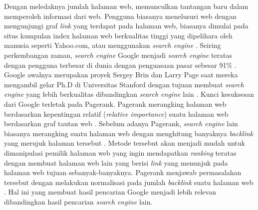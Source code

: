 Dengan meledaknya jumlah halaman web, memunculkan tantangan baru dalam memperoleh informasi dari web. Pengguna biasanya menelusuri web dengan mengunjungi graf \textit{link} yang terdapat pada halaman web, biasanya dimulai pada situs kumpulan index halaman web berkualitas tinggi yang dipelihara oleh manusia seperti Yahoo.com, atau menggunakan \textit{search engine} \citep{brin1998anatomy}. Seiring perkembangan zaman, \textit{search engine} Google menjadi \textit{search engine} teratas dengan pengguna terbesar di dunia dengan penguasaan pasar sebesar 91\% \citep{gsc2022marketshare}. Google awalnya merupakan proyek Sergey Brin dan Larry Page saat mereka mengambil gelar Ph.D di Universitas Stanford dengan tujuan membuat \textit{search engine} yang lebih berkualitas dibandingkan \textit{search engine} lain \citep{brin1998anatomy}. Kunci kesuksesan dari Google terletak pada Pagerank. Pagerank merangking halaman web berdasarkan kepentingan relatif (\textit{relative importance}) suatu halaman web berdasarkan graf tautan web \citep{ilprints422}. Sebelum adanya Pagerank, \textit{search engine} lain biasanya merangking suatu halaman web dengan menghitung banyaknya \textit{backlink} yang merujuk halaman tersebut \citep{ilprints422}. Metode tersebut akan menjadi mudah untuk dimanipulasi pemilik halaman web yang ingin mendapatkan \textit{ranking} teratas dengan membuat halaman web lain yang berisi \textit{link} yang menunjuk pada halaman web tujuan sebanyak-banyaknya. Pagerank menjawab permasalahan tersebut dengan melakukan normalisasi pada jumlah \textit{backlink} suatu halaman web \citep{brin1998anatomy}. Hal ini yang membuat hasil pencarian Google menjadi lebih relevan dibandingkan hasil pencarian \textit{search engine} lain.

